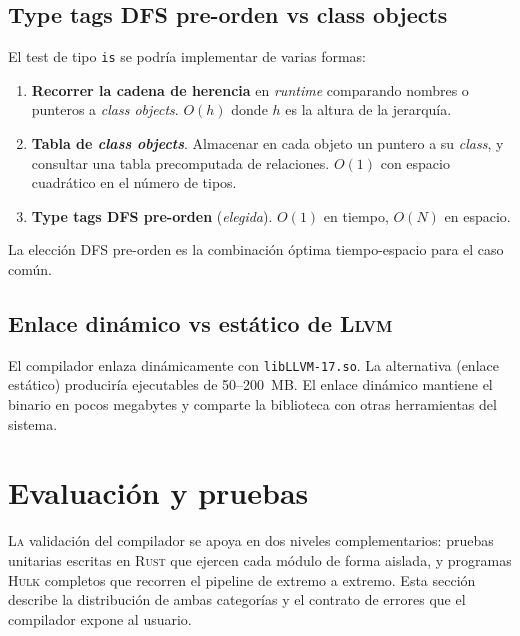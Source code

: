 \documentclass[11pt,a4paper,oneside,openany]{report}
\newcommand{\hulk}{\textsc{Hulk}}
\newcommand{\code}[1]{\texttt{#1}}
\newcommand{\rust}{\textsc{Rust}}
\newcommand{\llvm}{\textsc{Llvm}}
\begin{document}
\section{Type tags DFS pre-orden vs class objects}

El test de tipo \code{is} se podría implementar de varias formas:

\begin{enumerate}
  \item \textbf{Recorrer la cadena de herencia} en \textit{runtime} comparando
    nombres o punteros a \textit{class objects}. $O(h)$ donde $h$ es la altura
    de la jerarquía.
  \item \textbf{Tabla de \textit{class objects}}. Almacenar en cada objeto un
    puntero a su \textit{class}, y consultar una tabla precomputada de
    relaciones. $O(1)$ con espacio cuadrático en el número de tipos.
  \item \textbf{Type tags DFS pre-orden} (\textit{elegida}). $O(1)$ en tiempo,
    $O(N)$ en espacio.
\end{enumerate}

La elección DFS pre-orden es la combinación óptima tiempo-espacio para el caso
común.

\section{Enlace dinámico vs estático de \llvm{}}

El compilador enlaza dinámicamente con \code{libLLVM-17.so}. La alternativa
(enlace estático) produciría ejecutables de 50--200~MB. El enlace dinámico
mantiene el binario en pocos megabytes y comparte la biblioteca con otras
herramientas del sistema.

\chapter{Evaluación y pruebas}
\label{cap:ev}

\lettrine[lines=2,findent=2pt,nindent=0pt]{L}{a} validación del compilador se
apoya en dos niveles complementarios: pruebas unitarias escritas en \rust{}
que ejercen cada módulo de forma aislada, y programas \hulk{} completos que
recorren el pipeline de extremo a extremo. Esta sección describe la
distribución de ambas categorías y el contrato de errores que el compilador
expone al usuario.
\end{document}
